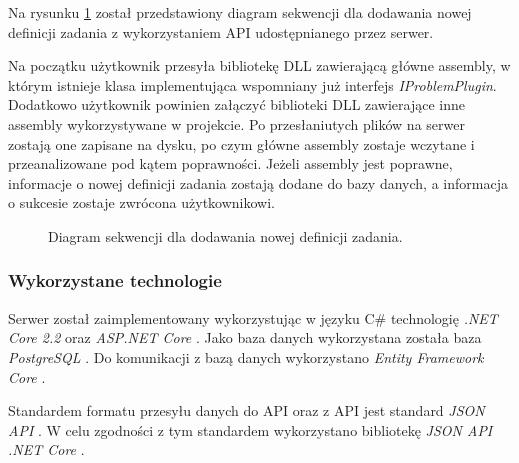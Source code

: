 \documentclass[a4paper,11pt,twoside]{report}
\theoremstyle{definition}
\begin{document}
Na rysunku \ref{task-definition-sequence-diagram} został przedstawiony diagram sekwencji dla dodawania nowej definicji zadania z wykorzystaniem API udostępnianego przez serwer.

Na początku użytkownik przesyła bibliotekę DLL zawierającą główne assembly, w którym istnieje klasa implementująca wspomniany już interfejs \textit{IProblemPlugin}. Dodatkowo użytkownik powinien załączyć biblioteki DLL zawierające inne assembly wykorzystywane w projekcie. Po przesłaniutych plików na serwer zostają one zapisane na dysku, po czym główne assembly zostaje wczytane i przeanalizowane pod kątem poprawności. Jeżeli assembly jest poprawne, informacje o nowej definicji zadania zostają dodane do bazy danych, a informacja o sukcesie zostaje zwrócona użytkownikowi.

\begin{figure}[H] 
	\caption{Diagram sekwencji dla dodawania nowej definicji zadania.}
	\label{task-definition-sequence-diagram}
\end{figure}

\subsubsection{Wykorzystane technologie}
Serwer został zaimplementowany wykorzystując w języku C\# technologię \textit{.NET Core 2.2} \cite{dotnet-core} oraz \textit{ASP.NET Core} \cite{aspnet-core}. Jako baza danych wykorzystana została baza \textit{PostgreSQL} \cite{postgresql}. Do komunikacji z bazą danych wykorzystano \textit{Entity Framework Core} \cite{ef-core}.

Standardem formatu przesyłu danych do API oraz z API jest standard \textit{JSON API} \cite{jsonapi}. W celu zgodności z tym standardem wykorzystano bibliotekę \textit{JSON API .NET Core} \cite{jsonapi-dotnet-core}.
\end{document}
